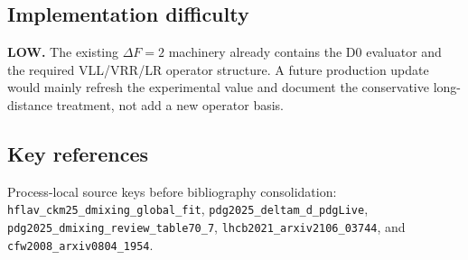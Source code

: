 \subsection*{Implementation difficulty}
\textbf{LOW.}  The existing \(\Delta F=2\) machinery already contains the
D0 evaluator and the required VLL/VRR/LR operator structure.  A future
production update would mainly refresh the experimental value and document the
conservative long-distance treatment, not add a new operator basis.

\subsection*{Key references}
Process-local source keys before bibliography consolidation:
\texttt{hflav\_ckm25\_dmixing\_global\_fit},
\texttt{pdg2025\_deltam\_d\_pdgLive},
\texttt{pdg2025\_dmixing\_review\_table70\_7},
\texttt{lhcb2021\_arxiv2106\_03744}, and
\texttt{cfw2008\_arxiv0804\_1954}.
